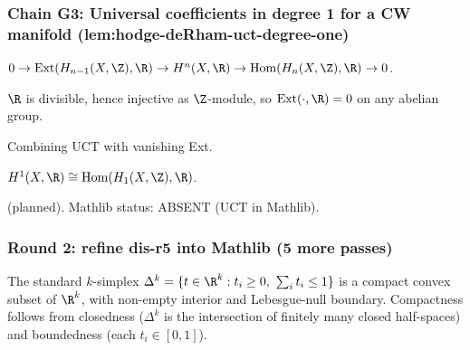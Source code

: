 \subsubsection*{Chain G3: Universal coefficients in degree 1 for a CW manifold (lem:hodge-deRham-uct-degree-one)}

\begin{lemma}
\label{lem:hdu-r1}
$0 \to \mathrm{Ext}(H_{n-1}(X,\Z),\R) \to H^{n}(X,\R) \to \mathrm{Hom}(H_{n}(X,\Z),\R) \to 0$.
\leanok
\end{lemma}

\begin{lemma}[Pass G3.2: $\mathrm{Ext}(\cdot,\R) = 0$ on f.g.\ abelian]
\label{lem:hdu-r2}
$\R$ is divisible, hence injective as $\Z$-module, so $\mathrm{Ext}(\cdot,\R) = 0$ on any abelian group.
\leanok
\end{lemma}

\begin{lemma}
\label{lem:hdu-r3}
Combining UCT with vanishing Ext.
\leanok
\end{lemma}

\begin{lemma}[Pass G3.4: specialize to $n=1$]
\label{lem:hdu-r4}
$H^{1}(X,\R) \cong \mathrm{Hom}(H_{1}(X,\Z),\R)$.
\leanok
\end{lemma}

\begin{lemma}
\label{lem:hdu-r5}
 (planned).  Mathlib status: ABSENT (UCT in Mathlib).
\leanok
\end{lemma}

\subsubsection*{Round 2: refine dis-r5 into Mathlib (5 more passes)}

\begin{lemma}
\label{lem:dis-r6}
The standard $k$-simplex $\Delta^{k} = \{t \in \R^{k} : t_{i}\ge 0,\ \sum_{i} t_{i}\le 1\}$ is a compact convex subset of $\R^{k}$, with non-empty interior and Lebesgue-null boundary.  Compactness follows from closedness ($\Delta^{k}$ is the intersection of finitely many closed half-spaces) and boundedness (each $t_{i}\in[0,1]$).
\leanok
\end{lemma}

